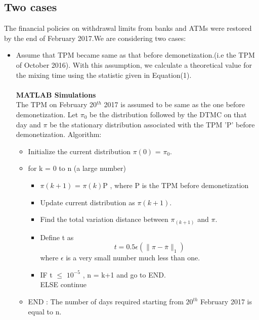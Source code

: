 \documentclass[12pt]{article}
\begin{document}
\subsection{Two cases}
The financial policies on withdrawal limits from banks and ATMs were restored by the end of February 2017.We are considering two cases:\\
\begin{itemize}
	\item Assume that TPM became same as that before demonetization.(i.e the TPM of October 2016). With this assumption, we calculate a theoretical value for the mixing time using the statistic given in Equation(1).
	\paragraph{}
	\textbf{MATLAB Simulations\\}
	The TPM on February 20$^{th}$ 2017 is assumed  to be same as the one before demonetization. Let $\pi_{0}$ be the distribution followed by the DTMC on that day and $\pi$ be the stationary distribution associated with the TPM 'P' before demonetization.
	Algorithm:
	\begin{itemize}
	\item Initialize the current distribution $\pi(0)$ = $\pi_{0}$.
	\item for k = 0 to n (a large number)
	  \begin{itemize}
	  \item $\pi(k+1)$ = $\pi(k)$P , where P is the TPM before demonetization
	  \item Update current distribution as $\pi(k+1)$.
	  \item Find the total variation distance between $\pi_(k+1)$ and $\pi$.
	  \item Define t as
	  \begin{equation}
	  t = 0.5\epsilon(\| \pi - \overline{\pi}\|_{1})
	  \end{equation}
	  where $\epsilon$ is a very small number much less than one.
	  \item  IF t $\leq$ $10^{-5}$ , n = k+1  and go to END.\\
	  ELSE continue
	  \end{itemize}
	  \item END : The number of days required starting from $20^{th}$ February 2017 is equal to n.
	\end{itemize}
	

\end{itemize}
\end{document}
